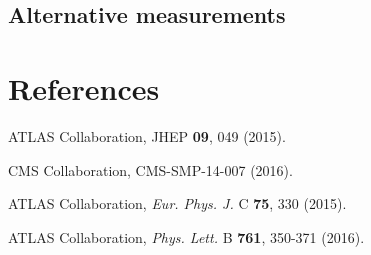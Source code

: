 \documentclass{blois}
\def\Journal#1#2#3#4{{#1} {\bf #2}, #3 (#4)}
\def\PLB{{\em Phys. Lett.}  B}
\def\EPJC{{\em Eur. Phys. J.} C}
\begin{document}
\subsection{Alternative measurements}


\section*{References}

\begin{thebibliography}{99}

ATLAS Collaboration, \Journal{JHEP}{09}{049}{2015}.

CMS Collaboration, CMS-SMP-14-007 (2016).

ATLAS Collaboration, \Journal{\EPJC}{75}{330}{2015}.

ATLAS Collaboration, \Journal{\PLB}{761}{350-371}{2016}.

\end{thebibliography}
\end{document}
